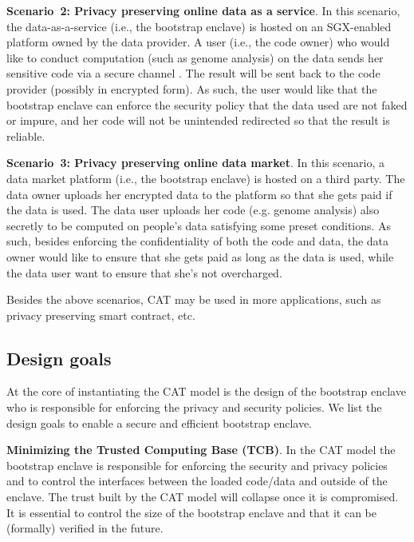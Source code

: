 {

\vspace{3pt}\noindent\textbf{Scenario~2: Privacy preserving online data as a service}. In this scenario, the data-as-a-service (i.e., the bootstrap enclave) is hosted on an SGX-enabled platform owned by the data provider. A user (i.e., the code owner) who would like to conduct computation (such as genome analysis) on the data sends her sensitive code via a secure channel . The result will be sent back to the code provider (possibly in encrypted form). As such, the user would like that the bootstrap enclave can enforce the security policy that the data used are not faked or impure, and her code will not be unintended redirected so that the result is reliable.



\vspace{3pt}\noindent\textbf{Scenario~3: Privacy preserving online data market}. In this scenario, a data market platform (i.e., the bootstrap enclave) is hosted on a third party.
The data owner uploads her encrypted data to the platform so that she gets paid if the data is used. The data user uploads her code (e.g. genome analysis) also secretly to be computed on people's data satisfying some preset conditions. As such, besides enforcing the confidentiality of both the code and data, the data owner would like to ensure that she gets paid as long as the data is used, while the data user want to ensure that she's not overcharged.

Besides the above scenarios, CAT may be used in more applications, such as privacy preserving smart contract, etc.

\subsection{Design goals}
\label{subsec-challenges} 
At the core of instantiating the CAT model is the design of the bootstrap enclave who is responsible for enforcing the privacy and security policies.
We list the design goals to enable a secure and efficient bootstrap enclave.

\vspace{3pt}\noindent\textbf{Minimizing the Trusted Computing Base (TCB)}.\label{challenge-tcb} 
    In the CAT model the bootstrap enclave is responsible for enforcing the security and privacy policies and to control the interfaces between the loaded code/data and outside of the enclave. The trust built by the CAT model will collapse once it is compromised. It is essential to control the size of the bootstrap enclave and that it can be (formally) verified in the future.

}
